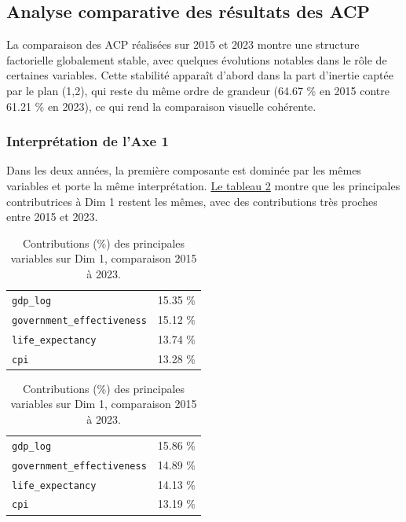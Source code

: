\documentclass{article}
\begin{document}
\subsection{Analyse comparative des résultats des ACP}

La comparaison des ACP réalisées sur 2015 et 2023 montre une structure factorielle globalement stable, avec quelques évolutions notables dans le rôle de certaines variables.
Cette stabilité apparaît d’abord dans la part d’inertie captée par le plan (1,2), qui reste du même ordre de grandeur (64.67 \% en 2015 contre 61.21 \% en 2023), ce qui rend la comparaison visuelle cohérente.

\subsubsection{Interprétation de l'Axe 1}

Dans les deux années, la première composante est dominée par les mêmes variables et porte la même interprétation.
\hyperref[tab:dim1_contrib_compare]{Le tableau \ref{tab:dim1_contrib_compare}} montre que les principales contributrices à Dim 1 restent les mêmes, avec des contributions très proches entre 2015 et 2023.

\begin{table}[H]
\centering
\renewcommand{\arraystretch}{1.15}

\begin{minipage}[t]{0.48\textwidth}
\centering
\begin{tabularx}{\linewidth}{>{\raggedright\arraybackslash}X r}
\toprule
\multicolumn{2}{c}{\textbf{Dim 1 (2015)}} \\
\midrule
\texttt{gdp\_log} & 15.35 \% \\
\texttt{government\_effectiveness} & 15.12 \% \\
\texttt{life\_expectancy} & 13.74 \% \\
\texttt{cpi} & 13.28 \% \\
\bottomrule
\end{tabularx}
\end{minipage}
\hfill
\begin{minipage}[t]{0.48\textwidth}
\centering
\begin{tabularx}{\linewidth}{>{\raggedright\arraybackslash}X r}
\toprule
\multicolumn{2}{c}{\textbf{Dim 1 (2023)}} \\
\midrule
\texttt{gdp\_log} & 15.86 \% \\
\texttt{government\_effectiveness} & 14.89 \% \\
\texttt{life\_expectancy} & 14.13 \% \\
\texttt{cpi} & 13.19 \% \\
\bottomrule
\end{tabularx}
\end{minipage}

\caption{Contributions (\%) des principales variables sur Dim 1, comparaison 2015 à 2023.}
\label{tab:dim1_contrib_compare}
\end{table}
\end{document}
